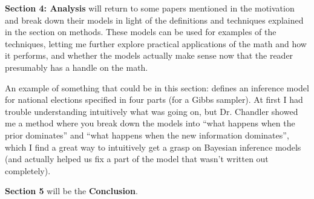 \documentclass[12pt]{article}
\begin{document}
\textbf{Section 4: Analysis} will return to some papers mentioned in the motivation and break down their models in light of the definitions and techniques explained in the section on methods. These models can be used for examples of the techniques, letting me further explore practical applications of the math and how it performs, and whether the models actually make sense now that the reader presumably has a handle on the math.

An example of something that could be in this section: \citet{Strauss:2007aa} defines an inference model for national elections specified in four parts (for a Gibbs sampler). At first I had trouble understanding intuitively what was going on, but Dr. Chandler showed me a method where you break down the models into ``what happens when the prior dominates'' and ``what happens when the new information dominates'', which I find a great way to intuitively get a grasp on Bayesian inference models (and actually helped us fix a part of the model that wasn't written out completely).

\textbf{Section 5} will be the \textbf{Conclusion}.


\end{document}
